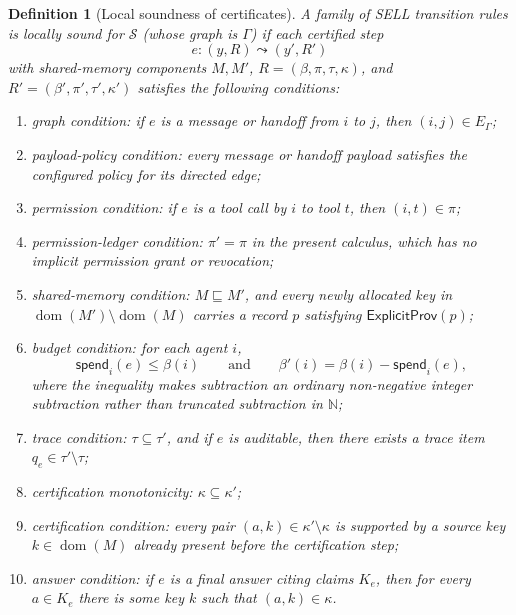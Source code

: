 \documentclass[a4paper,fleqn]{cas-sc}
\newtheorem{definition}{Definition}
\newcommand{\Nat}{\mathbb{N}}
\begin{document}
\begin{definition}[Local soundness of certificates]\label{def:local-soundness}
A family of SELL transition rules is locally sound for \(\mathcal S\) (whose
graph is \(\Gamma\)) if each certified step
\[
  e:(y,R)\leadsto(y',R')
\]
with shared-memory components \(M,M'\), \(R=(\beta,\pi,\tau,\kappa)\), and \(R'=(\beta',\pi',\tau',\kappa')\) satisfies the following conditions:
\begin{enumerate}
  \item graph condition: if \(e\) is a message or handoff from \(i\) to \(j\), then \((i,j)\in E_{\Gamma}\);
  \item payload-policy condition: every message or handoff payload satisfies the configured policy for its directed edge;
  \item permission condition: if \(e\) is a tool call by \(i\) to tool \(t\), then \((i,t)\in\pi\);
  \item permission-ledger condition: \(\pi'=\pi\) in the present calculus, which has no implicit permission grant or revocation;
  \item shared-memory condition: \(M\sqsubseteq M'\), and every newly allocated key in \(\operatorname{dom}(M')\setminus\operatorname{dom}(M)\) carries a record \(p\) satisfying \(\mathsf{ExplicitProv}(p)\);
  \item budget condition: for each agent \(i\),
  \[
    \mathsf{spend}_i(e)\le \beta(i)
    \qquad\text{and}\qquad
    \beta'(i)=\beta(i)-\mathsf{spend}_i(e),
  \]
  where the inequality makes subtraction an ordinary non-negative integer
  subtraction rather than truncated subtraction in \(\Nat\);
  \item trace condition: \(\tau\subseteq\tau'\), and if \(e\) is auditable, then there exists a trace item \(q_e\in\tau'\setminus\tau\);
  \item certification monotonicity: \(\kappa\subseteq\kappa'\);
  \item certification condition: every pair \((a,k)\in\kappa'\setminus\kappa\) is supported by a source key \(k\in\operatorname{dom}(M)\) already present before the certification step;
  \item answer condition: if \(e\) is a final answer citing claims \(K_e\), then for every \(a\in K_e\) there is some key \(k\) such that \((a,k)\in\kappa\).
\end{enumerate}
\end{definition}
\end{document}
